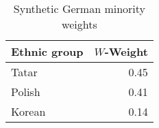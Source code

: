 \begin{table}[t]

\caption{\label{tab:sc_weights_robustness}Synthetic German minority weights}
\centering
\begin{tabular}{lr}
\toprule
Ethnic group & $W$-Weight\\
\midrule
Tatar & 0.45\\
Polish & 0.41\\
Korean & 0.14\\
\bottomrule
\end{tabular}
\end{table}